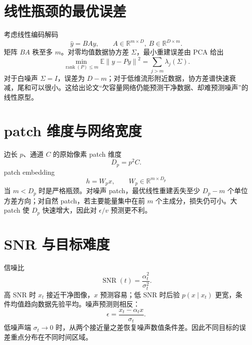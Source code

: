 \documentclass[UTF8,12pt,a4paper,fontset=none]{ctexart}
\numberwithin{equation}{section}
\newcommand{\R}{\mathbb{R}}
\newcommand{\E}{\mathbb{E}}
\newcommand{\norm}[1]{\left\lVert #1\right\rVert}
\newcommand{\rank}{\operatorname{rank}}
\begin{document}
\section{线性瓶颈的最优误差}
考虑线性编码解码
\begin{equation}
 \widehat y=BAy,
 \qquad A\in\R^{m\times D},\ B\in\R^{D\times m}.
\end{equation}
矩阵 $BA$ 秩至多 $m$。对零均值数据协方差 $\Sigma$，最小重建误差由 PCA 给出
\begin{equation}
 \min_{\rank(P)\le m}\E\norm{y-Py}^2
 =\sum_{j>m}\lambda_j(\Sigma).
\end{equation}
对于白噪声 $\Sigma=I$，误差为 $D-m$；对于低维流形附近数据，协方差谱快速衰减，尾和可以很小。这给出论文“欠容量网络仍能预测干净数据、却难预测噪声”的线性原型。

\section{patch 维度与网络宽度}
边长 $p$、通道 $C$ 的原始像素 patch 维度
\begin{equation}
 D_p=p^2C.
\end{equation}
patch embedding
\begin{equation}
 h=W_px,
 \qquad W_p\in\R^{m\times D_p}
\end{equation}
当 $m<D_p$ 时是严格瓶颈。对噪声 patch，最优线性重建丢失至少 $D_p-m$ 个单位方差方向；对自然 patch，若主要能量集中在前 $m$ 个主成分，损失仍可小。大 patch 使 $D_p$ 快速增大，因此对 $\epsilon/v$ 预测更不利。

\section{SNR 与目标难度}
信噪比
\begin{equation}
 \operatorname{SNR}(t)=\frac{\alpha_t^2}{\sigma_t^2}.
\end{equation}
高 SNR 时 $x_t$ 接近干净图像，$x$ 预测容易；低 SNR 时后验 $p(x\mid x_t)$ 更宽，条件均值趋向数据先验平均。噪声预测则相反：
\begin{equation}
 \epsilon=\frac{x_t-\alpha_tx}{\sigma_t}.
\end{equation}
低噪声端 $\sigma_t\to0$ 时，从两个接近量之差恢复噪声数值条件差。因此不同目标的误差重点分布在不同时间区域。
\end{document}
